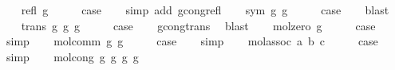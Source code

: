 \begin{isabellebody}
\ \ \isamarkupfalse%
\ {\isacharparenleft}{\kern0pt}refl\ g{\isacharparenright}{\kern0pt}\isanewline
\ \ \isamarkupfalse%
\ \isamarkupfalse%
\ {\isacharquery}{\kern0pt}case\isanewline
\ \ \isamarkupfalse%
\ {\isacharparenleft}{\kern0pt}simp\ add{\isacharcolon}{\kern0pt}\ gcong{\isachardot}{\kern0pt}refl{\isacharparenright}{\kern0pt}\isanewline
{}\isamarkupfalse%
\isanewline
\ \ \isamarkupfalse%
\ {\isacharparenleft}{\kern0pt}sym\ g{}\ g{}{\isacharparenright}{\kern0pt}\isanewline
\ \ \isamarkupfalse%
\ \isamarkupfalse%
\ {\isacharquery}{\kern0pt}case\isanewline
\ \ \isamarkupfalse%
\ blast\isanewline
{}\isamarkupfalse%
\isanewline
\ \ \isamarkupfalse%
\ {\isacharparenleft}{\kern0pt}trans\ g{}\ g{}\ g{}{\isacharparenright}{\kern0pt}\isanewline
\ \ \isamarkupfalse%
\ \isamarkupfalse%
\ {\isacharquery}{\kern0pt}case\isanewline
\ \ \isamarkupfalse%
\ gcong{\isachardot}{\kern0pt}trans\ \isamarkupfalse%
\ blast\isanewline
{}\isamarkupfalse%
\isanewline
\ \ \isamarkupfalse%
\ {\isacharparenleft}{\kern0pt}mol{\isacharunderscore}{\kern0pt}zero\ g{\isacharparenright}{\kern0pt}\isanewline
\ \ \isamarkupfalse%
\ \isamarkupfalse%
\ {\isacharquery}{\kern0pt}case\isanewline
\ \ \isamarkupfalse%
\ simp\isanewline
{}\isamarkupfalse%
\isanewline
\ \ \isamarkupfalse%
\ {\isacharparenleft}{\kern0pt}mol{\isacharunderscore}{\kern0pt}comm\ g{}\ g{}{\isacharparenright}{\kern0pt}\isanewline
\ \ \isamarkupfalse%
\ \isamarkupfalse%
\ {\isacharquery}{\kern0pt}case\isanewline
\ \ \isamarkupfalse%
\ simp\isanewline
{}\isamarkupfalse%
\isanewline
\ \ \isamarkupfalse%
\ {\isacharparenleft}{\kern0pt}mol{\isacharunderscore}{\kern0pt}assoc\ a\ b\ c{\isacharparenright}{\kern0pt}\isanewline
\ \ \isamarkupfalse%
\ \isamarkupfalse%
\ {\isacharquery}{\kern0pt}case\isanewline
\ \ \isamarkupfalse%
\ simp\isanewline
{}\isamarkupfalse%
\isanewline
\ \ \isamarkupfalse%
\ {\isacharparenleft}{\kern0pt}mol{\isacharunderscore}{\kern0pt}cong\ g{}\ g{}{\isacharprime}{\kern0pt}\ g{}\ g{}{\isacharprime}{\kern0pt}{\isacharparenright}{\kern0pt}\isanewline

\end{isabellebody}
